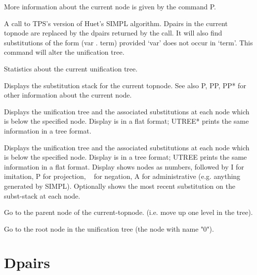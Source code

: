 \begin{description}
More information about the current node is given by the command P.

\item[SIMPLIFY]  
A call to TPS's version of Huet's SIMPL algorithm. Dpairs in the 
current topnode are replaced by the dpairs returned by the call. It will 
also find substitutions of the form (var . term) provided `var' does not
occur in `term'. This command will alter the unification tree.

\item[STATS]  
Statistics about the current unification tree.

\item[SUBST-STACK]  
Displays the substitution stack for the current topnode.
See also P, PP, PP* for other information about the current node.

\item[UTREE]  
Displays the unification tree and the associated substitutions at
each node which is below the specified node. Display is in a flat
format; UTREE* prints the same information in a tree format.

\item[UTREE*]  
Displays the unification tree and the associated substitutions at
each node which is below the specified node. Display is in a tree
format; UTREE prints the same information in a flat format. Display 
shows nodes as numbers, followed by I for imitation, P for projection,
~ for negation, A for administrative (e.g. anything generated by SIMPL).
Optionally shows the most recent substitution on the subst-stack at 
each node.

\item[\textasciicircum ] \index{\textasciicircum } 
Go to the parent node of the current-topnode.
(i.e. move up one level in the tree).

\item[\textasciicircum \textasciicircum ] \index{\textasciicircum \textasciicircum } 
Go to the root node in the unification tree 
(the node with name "0").
\item
\end{description}

\section{Dpairs}


